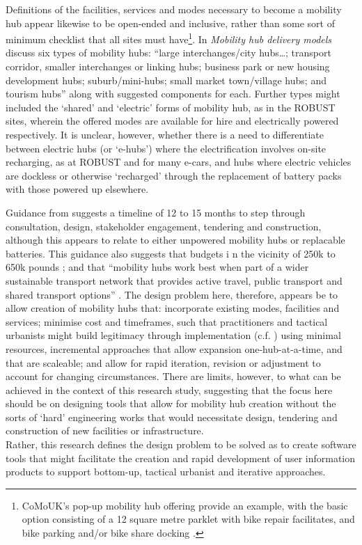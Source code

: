 \documentclass[preprint, 3p,
authoryear]{elsarticle} %
\begin{document}
Definitions of the facilities, services and modes necessary to become a
mobility hub appear likewise to be open-ended and inclusive, rather than
some sort of minimum checklist that all sites must have\footnote{CoMoUK's
  pop-up mobility hub offering provide an example, with the basic option
  consisting of a 12 square metre parklet with bike repair facilitates,
  and bike parking and/or bike share docking \citep{CoMoUK:0aa}.}. In
\emph{Mobility hub delivery models} \cite{CoMoUK:2021aa} discuss six
types of mobility hubs: ``large interchanges/city hubs\ldots; transport
corridor, smaller interchanges or linking hubs; business park or new
housing development hubs; suburb/mini-hubs; small market town/village
hubs; and tourism hubs'' along with suggested components for each.
Further types might included the `shared' and `electric' forms of
mobility hub, as in the ROBUST sites, wherein the offered modes are
available for hire and electrically powered respectively. It is unclear,
however, whether there is a need to differentiate between electric hubs
(or `e-hubs') where the electrification involves on-site recharging, as
at ROBUST and for many e-cars, and hubs where electric vehicles are
dockless or otherwise `recharged' through the replacement of battery
packs with those powered up elsewhere.

Guidance from \cite{CoMoUK:0ab} suggests a timeline of 12 to 15 months
to step through consultation, design, stakeholder engagement, tendering
and construction, although this appears to relate to either unpowered
mobility hubs or replacable batteries. This guidance also suggests that
budgets i n the vicinity of 250k to 650k pounds \cite{CoMoUK:0ac}; and
that ``mobility hubs work best when part of a wider sustainable
transport network that provides active travel, public transport and
shared transport options'' \cite{CoMoUK:0aa}. The design problem here,
therefore, appears be to allow creation of mobility hubs that:
incorporate existing modes, facilities and services; minimise cost and
timeframes, such that practitioners and tactical urbanists might build
legitimacy through implementation (c.f.
\cite{Reynolds:2020aa,Reynolds:2021ab}) using minimal resources,
incremental approaches that allow expansion one-hub-at-a-time, and that
are scaleable; and allow for rapid iteration, revision or adjustment to
account for changing circumstances. There are limits, however, to what
can be achieved in the context of this research study, suggesting that
the focus here should be on designing tools that allow for mobility hub
creation without the sorts of `hard' engineering works that would
necessitate design, tendering and construction of new facilities or
infrastructure.\\
Rather, this research defines the design problem to be solved as to
create software tools that might facilitate the creation and rapid
development of user information products to support bottom-up, tactical
urbanist and iterative approaches.
\end{document}

